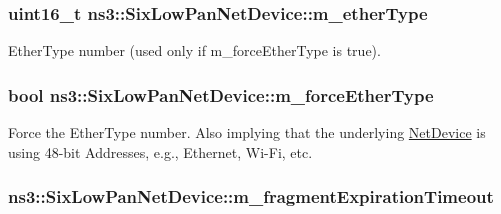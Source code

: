 \subsubsection[{\texorpdfstring{m\+\_\+ether\+Type}{m_etherType}}]{\setlength{\rightskip}{0pt plus 5cm}uint16\+\_\+t ns3\+::\+Six\+Low\+Pan\+Net\+Device\+::m\+\_\+ether\+Type\hspace{0.3cm}{\ttfamily [private]}}\hypertarget{classns3_1_1SixLowPanNetDevice_afdea8e77d8ec66aef94e8cdbb645004b}{}\label{classns3_1_1SixLowPanNetDevice_afdea8e77d8ec66aef94e8cdbb645004b}


Ether\+Type number (used only if m\+\_\+force\+Ether\+Type is true). 

\subsubsection[{\texorpdfstring{m\+\_\+force\+Ether\+Type}{m_forceEtherType}}]{\setlength{\rightskip}{0pt plus 5cm}bool ns3\+::\+Six\+Low\+Pan\+Net\+Device\+::m\+\_\+force\+Ether\+Type\hspace{0.3cm}{\ttfamily [private]}}\hypertarget{classns3_1_1SixLowPanNetDevice_a57d9f56656023ad738e092ba9f668192}{}\label{classns3_1_1SixLowPanNetDevice_a57d9f56656023ad738e092ba9f668192}


Force the Ether\+Type number. Also implying that the underlying \hyperlink{classns3_1_1NetDevice}{Net\+Device} is using 48-\/bit Addresses, e.\+g., Ethernet, Wi-\/\+Fi, etc. 

\subsubsection[{\texorpdfstring{m\+\_\+fragment\+Expiration\+Timeout}{m_fragmentExpirationTimeout}}]{ ns3\+::\+Six\+Low\+Pan\+Net\+Device\+::m\+\_\+fragment\+Expiration\+Timeout\hspace{0.3cm}{\ttfamily [private]}}\hypertarget{classns3_1_1SixLowPanNetDevice_ace8f2bb99c947fdaa963d8372467642c}{}\label{classns3_1_1SixLowPanNetDevice_ace8f2bb99c947fdaa963d8372467642c}


